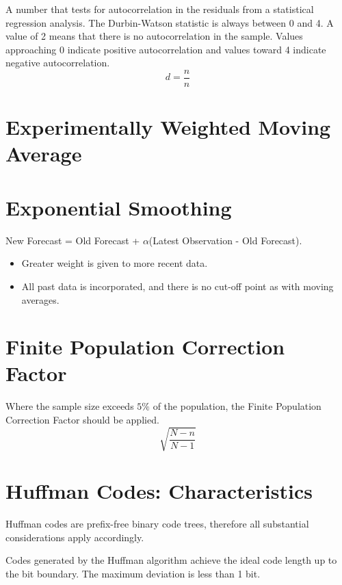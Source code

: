 A number that tests for autocorrelation in the residuals from a statistical regression analysis. The Durbin-Watson statistic is always between 0 and 4. A value of 2 means that there is no autocorrelation in the sample. Values approaching 0 indicate positive autocorrelation and values toward 4 indicate negative autocorrelation.
\begin{equation}
d = \frac{n}{n}
\end{equation}
\section{Experimentally Weighted Moving Average}




\section{Exponential Smoothing}

New Forecast = Old Forecast + $\alpha$(Latest Observation - Old Forecast).

\begin{itemize}
	\item Greater weight is given to more recent data.
	\item All past data is incorporated, and there is no cut-off point as with moving averages.
\end{itemize}




\section{Finite Population Correction Factor}
Where the sample size exceeds $5\%$ of the population, the Finite Population Correction Factor should be applied.
\[ \sqrt{\frac{N-n}{N-1}} \]


\section{Huffman Codes: Characteristics}

Huffman codes are prefix-free binary code trees, therefore all substantial considerations apply accordingly.

Codes generated by the Huffman algorithm achieve the ideal code length up to the bit boundary.
The maximum deviation is less than 1 bit.
